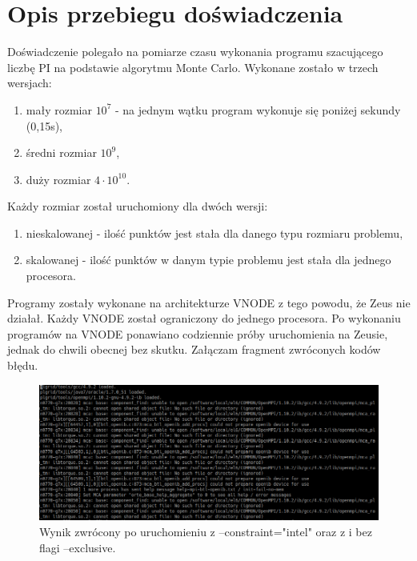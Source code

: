 \documentclass[10pt,english, openany]{book}
\begin{document}
\tableofcontents{}

\mainmatter

\chapter{Opis przebiegu doświadczenia}\label{chapt:opis}
Doświadczenie polegało na pomiarze czasu wykonania programu szacującego liczbę PI na podstawie algorytmu Monte Carlo. Wykonane zostało w trzech wersjach:
\begin{enumerate}
\item mały rozmiar $10^7$ - na jednym wątku program wykonuje się poniżej sekundy (0,15s),
\item średni rozmiar $10^9$,
\item duży rozmiar $4\cdot10^{10}$.
\end{enumerate}
Każdy rozmiar został uruchomiony dla dwóch wersji:
\begin{enumerate}
\item nieskalowanej - ilość punktów jest stała dla danego typu rozmiaru problemu,
\item skalowanej - ilość punktów w danym typie problemu jest stała dla jednego procesora.
\end{enumerate}

Programy zostały wykonane na architekturze VNODE z tego powodu, że Zeus nie działał. Każdy VNODE został ograniczony do jednego procesora. Po wykonaniu programów na VNODE ponawiano codziennie próby uruchomienia na Zeusie, jednak do chwili obecnej bez skutku. Załączam fragment zwróconych kodów błędu.
\begin{figure}[h]
\centering
\includegraphics[scale=0.65]{pics/error_1.png}
\caption{Wynik zwrócony po uruchomieniu z --constraint="intel" oraz z i bez flagi --exclusive.}
\end{figure}
\end{document}
